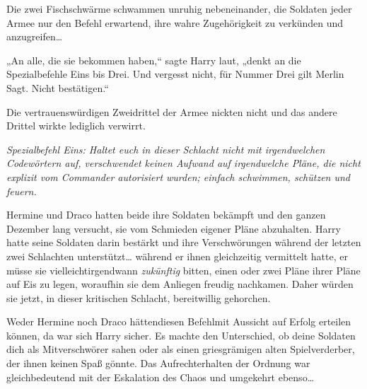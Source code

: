 Die zwei Fischschwärme schwammen unruhig nebeneinander, die Soldaten jeder Armee nur den Befehl erwartend, ihre wahre Zugehörigkeit zu verkünden und anzugreifen…

„An alle, die sie bekommen haben,“ sagte Harry laut, „denkt an die Spezialbefehle Eins bis Drei. Und vergesst nicht, für Nummer Drei gilt Merlin Sagt. Nicht bestätigen.“

Die vertrauenswürdigen Zweidrittel der Armee nickten nicht und das andere Drittel wirkte lediglich verwirrt.

\emph{Spezialbefehl Eins: Haltet euch in dieser Schlacht nicht mit irgendwelchen Codewörtern auf, verschwendet keinen Aufwand auf irgendwelche Pläne, die nicht explizit vom Commander autorisiert wurden; einfach schwimmen, schützen und feuern.}

Hermine und Draco hatten beide ihre Soldaten bekämpft und den ganzen Dezember lang versucht, sie vom Schmieden eigener Pläne abzuhalten. Harry hatte seine Soldaten darin bestärkt und ihre Verschwörungen während der letzten zwei Schlachten unterstützt… während er ihnen gleichzeitig vermittelt hatte, er müsse sie vielleichtirgendwann \emph{zukünftig} bitten, einen oder zwei Pläne ihrer Pläne auf Eis zu legen, woraufhin sie dem Anliegen freudig nachkamen. Daher würden sie jetzt, in dieser kritischen Schlacht, bereitwillig gehorchen.

Weder Hermine noch Draco hättendiesen Befehlmit Aussicht auf Erfolg erteilen können, da war sich Harry sicher. Es machte den Unterschied, ob deine Soldaten dich als Mitverschwörer sahen oder als einen griesgrämigen alten Spielverderber, der ihnen keinen Spaß gönnte. Das Aufrechterhalten der Ordnung war gleichbedeutend mit der Eskalation des Chaos und umgekehrt ebenso…

